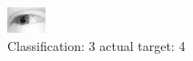 \begin{figure}[h!]
\begin{center}
\includegraphics[width=0.60\columnwidth]{figures/ID2431_class_3_target_4.png}
\end{center}
\caption{ Classification: 3 actual target: 4}
\label{fig:ID2431_class_3_target_4}
\end{figure}
